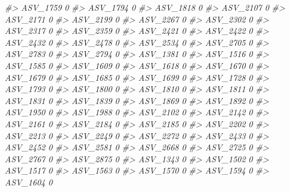 \documentclass[
]{article}
\newenvironment{Shaded}{\begin{snugshade}}{\end{snugshade}}
\newcommand{\CommentTok}[1]{\textcolor[rgb]{0.56,0.35,0.01}{\textit{#1}}}
\begin{document}
\begin{Shaded}
\begin{Highlighting}[]
\CommentTok{\#\textgreater{} ASV\_1759  0}
\CommentTok{\#\textgreater{} ASV\_1794  0}
\CommentTok{\#\textgreater{} ASV\_1818  0}
\CommentTok{\#\textgreater{} ASV\_2107  0}
\CommentTok{\#\textgreater{} ASV\_2171  0}
\CommentTok{\#\textgreater{} ASV\_2199  0}
\CommentTok{\#\textgreater{} ASV\_2267  0}
\CommentTok{\#\textgreater{} ASV\_2302  0}
\CommentTok{\#\textgreater{} ASV\_2317  0}
\CommentTok{\#\textgreater{} ASV\_2359  0}
\CommentTok{\#\textgreater{} ASV\_2421  0}
\CommentTok{\#\textgreater{} ASV\_2422  0}
\CommentTok{\#\textgreater{} ASV\_2432  0}
\CommentTok{\#\textgreater{} ASV\_2478  0}
\CommentTok{\#\textgreater{} ASV\_2534  0}
\CommentTok{\#\textgreater{} ASV\_2705  0}
\CommentTok{\#\textgreater{} ASV\_2783  0}
\CommentTok{\#\textgreater{} ASV\_2794  0}
\CommentTok{\#\textgreater{} ASV\_1381  0}
\CommentTok{\#\textgreater{} ASV\_1516  0}
\CommentTok{\#\textgreater{} ASV\_1585  0}
\CommentTok{\#\textgreater{} ASV\_1609  0}
\CommentTok{\#\textgreater{} ASV\_1618  0}
\CommentTok{\#\textgreater{} ASV\_1670  0}
\CommentTok{\#\textgreater{} ASV\_1679  0}
\CommentTok{\#\textgreater{} ASV\_1685  0}
\CommentTok{\#\textgreater{} ASV\_1699  0}
\CommentTok{\#\textgreater{} ASV\_1728  0}
\CommentTok{\#\textgreater{} ASV\_1793  0}
\CommentTok{\#\textgreater{} ASV\_1800  0}
\CommentTok{\#\textgreater{} ASV\_1810  0}
\CommentTok{\#\textgreater{} ASV\_1811  0}
\CommentTok{\#\textgreater{} ASV\_1831  0}
\CommentTok{\#\textgreater{} ASV\_1839  0}
\CommentTok{\#\textgreater{} ASV\_1869  0}
\CommentTok{\#\textgreater{} ASV\_1892  0}
\CommentTok{\#\textgreater{} ASV\_1950  0}
\CommentTok{\#\textgreater{} ASV\_1988  0}
\CommentTok{\#\textgreater{} ASV\_2102  0}
\CommentTok{\#\textgreater{} ASV\_2142  0}
\CommentTok{\#\textgreater{} ASV\_2161  0}
\CommentTok{\#\textgreater{} ASV\_2184  0}
\CommentTok{\#\textgreater{} ASV\_2185  0}
\CommentTok{\#\textgreater{} ASV\_2202  0}
\CommentTok{\#\textgreater{} ASV\_2213  0}
\CommentTok{\#\textgreater{} ASV\_2249  0}
\CommentTok{\#\textgreater{} ASV\_2272  0}
\CommentTok{\#\textgreater{} ASV\_2433  0}
\CommentTok{\#\textgreater{} ASV\_2452  0}
\CommentTok{\#\textgreater{} ASV\_2581  0}
\CommentTok{\#\textgreater{} ASV\_2668  0}
\CommentTok{\#\textgreater{} ASV\_2725  0}
\CommentTok{\#\textgreater{} ASV\_2767  0}
\CommentTok{\#\textgreater{} ASV\_2875  0}
\CommentTok{\#\textgreater{} ASV\_1343  0}
\CommentTok{\#\textgreater{} ASV\_1502  0}
\CommentTok{\#\textgreater{} ASV\_1517  0}
\CommentTok{\#\textgreater{} ASV\_1563  0}
\CommentTok{\#\textgreater{} ASV\_1570  0}
\CommentTok{\#\textgreater{} ASV\_1594  0}
\CommentTok{\#\textgreater{} ASV\_1604  0}

\end{Highlighting}
\end{Shaded}
\end{document}
